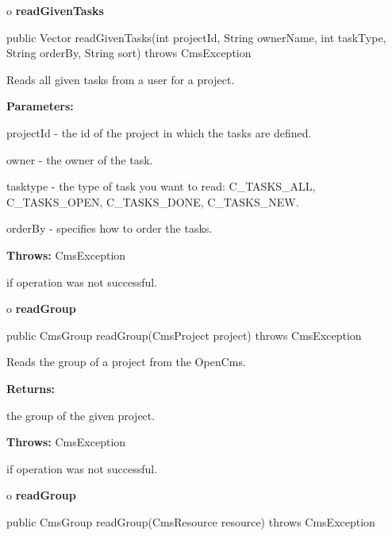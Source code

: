 o {\bf readGivenTasks}

\begin{PRE}
 public Vector readGivenTasks(int projectId,
                              String ownerName,
                              int taskType,
                              String orderBy,
                              String sort) throws CmsException
\end{PRE}

\begin{description}
\htmlDD Reads all given tasks from a user for a project.

\begin{description}
\item {\bf Parameters:}

projectId - the id of the project in which the tasks are defined.

owner - the owner of the task.

tasktype - the type of task you want to read: C\_TASKS\_ALL, C\_TASKS\_OPEN,
C\_TASKS\_DONE, C\_TASKS\_NEW.

orderBy - specifies how to order the tasks.
\item {\bf Throws:} CmsException

if operation was not successful.
\end{description}

\end{description}

o {\bf readGroup}

\begin{PRE}
 public CmsGroup readGroup(CmsProject project) throws CmsException
\end{PRE}

\begin{description}
\htmlDD Reads the group of a project from the OpenCms.

\begin{description}
\item {\bf Returns:}

the group of the given project.
\item {\bf Throws:} CmsException

if operation was not successful.
\end{description}

\end{description}

o {\bf readGroup}

\begin{PRE}
 public CmsGroup readGroup(CmsResource resource) throws CmsException
\end{PRE}

